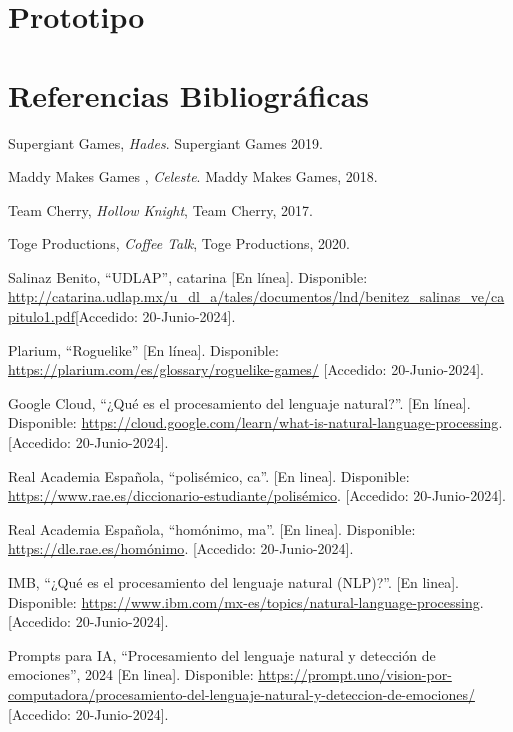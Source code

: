 \documentclass[12pt,twoside]{article}
\begin{document}
	\clearpage
	
	\section{Prototipo}

	\clearpage
	
	\section{Referencias Bibliográficas}
	
	\begin{thebibliography}{10}
	
	Supergiant Games, \textit{Hades}. Supergiant Games 2019.
	
	Maddy Makes Games , \textit{Celeste}. Maddy Makes Games, 2018.
	
	Team Cherry, \textit{Hollow Knight}, Team Cherry, 2017.
	
	Toge Productions, \textit{Coffee Talk}, Toge Productions, 2020.

	Salinaz Benito, ``UDLAP'', catarina [En línea]. Disponible: \url{http://catarina.udlap.mx/u_dl_a/tales/documentos/lnd/benitez_salinas_ve/capitulo1.pdf}[Accedido: 20-Junio-2024].

	Plarium, ``Roguelike'' [En línea]. Disponible: \url{https://plarium.com/es/glossary/roguelike-games/} [Accedido: 20-Junio-2024].

	Google Cloud, ``¿Qué es el procesamiento del lenguaje natural?''. [En línea]. Disponible: \url{https://cloud.google.com/learn/what-is-natural-language-processing}. [Accedido: 20-Junio-2024].

	Real Academia Española, ``polisémico, ca''. [En  linea]. Disponible: \url{https://www.rae.es/diccionario-estudiante/polisémico}. [Accedido: 20-Junio-2024].
	
	Real Academia Española, ``homónimo, ma''. [En  linea]. Disponible: \url{https://dle.rae.es/homónimo}. [Accedido: 20-Junio-2024].

	IMB, ``¿Qué es el procesamiento del lenguaje natural (NLP)?''. [En linea]. Disponible: \url{https://www.ibm.com/mx-es/topics/natural-language-processing}. [Accedido: 20-Junio-2024].

	Prompts para IA, ``Procesamiento del lenguaje natural y detección de emociones'', 2024 [En linea]. Disponible: \url{https://prompt.uno/vision-por-computadora/procesamiento-del-lenguaje-natural-y-deteccion-de-emociones/} [Accedido: 20-Junio-2024].


\end{thebibliography}
\end{document}

